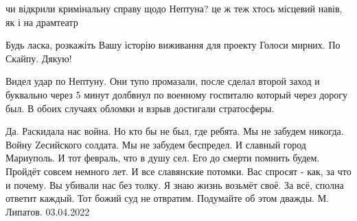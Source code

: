  
 
 
 
 

\qqSecCmt


чи відкрили кримінальну справу щодо Нептуна? це ж теж хтось місцевий навів, як
і на драмтеатр


Будь ласка, розкажіть Вашу історію виживання для проекту Голоси мирних. По
Скайпу. Дякую!


Видел удар по Нептуну. Они тупо промазали, после сделал второй заход и
буквально через 5 минут долбвнул по военному госпиталю который через дорогу
был. В обоих случаях обломки и взрыв достигали стратосферы.


\obeycr
Да. Раскидала нас война.
Но кто бы не был, где ребята.
Мы не забудем никогда.
Войну Zесийского солдата.
Мы не забудем беспредел.
И славный город Мариуполь.
И тот февраль, что в душу сел.
Его до смерти помнить будем.
Пройдёт совсем немного лет.
И все славянские потомки.
Вас спросят - как, за что и почему.
Вы убивали нас без толку.
Я знаю жизнь возьмёт своё.
За всё, сполна ответит каждый.
Тот божий суд не отвратим.
Подумайте об этом дважды.
М. Липатов. 03.04.2022
\restorecr
